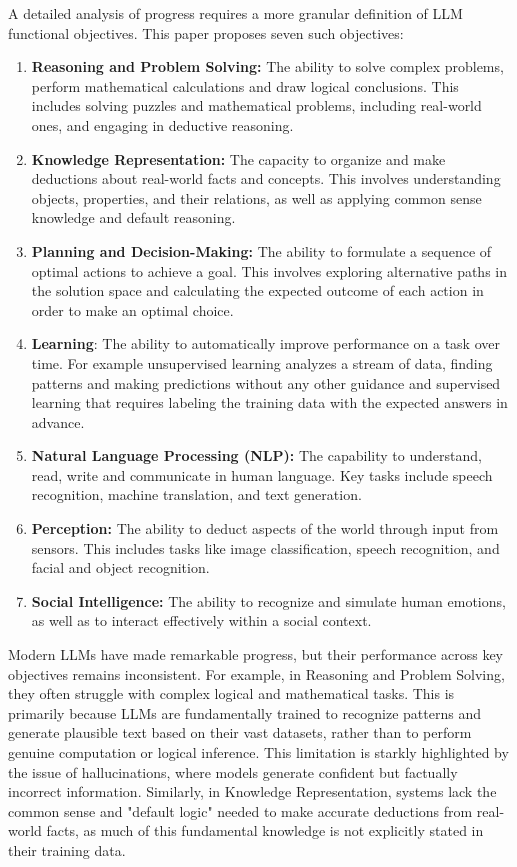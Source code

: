 \documentclass[12pt]{article}
\begin{document}
A detailed analysis of progress requires a more granular definition of LLM functional objectives. This paper proposes seven such objectives:
\begin{enumerate}
    \item \textbf{Reasoning and Problem Solving:} The ability to solve complex problems, perform mathematical calculations and draw logical conclusions. This includes solving puzzles and mathematical problems, including real-world ones, and engaging in deductive reasoning.

    \item \textbf{Knowledge Representation:} The capacity to organize and make deductions about real-world facts and concepts. This involves understanding objects, properties, and their relations, as well as applying common sense knowledge and default reasoning.

    \item \textbf{Planning and Decision-Making:} The ability to formulate a sequence of optimal actions to achieve a goal. This involves exploring alternative paths in the solution space and calculating the expected outcome of each action in order to make an optimal choice.

    \item \textbf{Learning}: The ability to automatically improve performance on a task over time. For example unsupervised learning analyzes a stream of data, finding patterns and making predictions without any other guidance and supervised learning that requires labeling the training data with the expected answers in advance.

     \item \textbf{Natural Language Processing (NLP):}  The capability to understand, read, write and communicate in human language. Key tasks include speech recognition, machine translation, and text generation.

    \item \textbf{Perception:} The ability to deduct aspects of the world through input from sensors. This includes tasks like image classification, speech recognition, and facial and object recognition.

    \item \textbf{Social Intelligence:} The ability to recognize and simulate human emotions, as well as to interact effectively within a social context.
\end{enumerate}
Modern LLMs have made remarkable progress, but their performance across key objectives remains inconsistent. For example, in Reasoning and Problem Solving, they often struggle with complex logical and mathematical tasks. This is primarily because LLMs are fundamentally trained to recognize patterns and generate plausible text based on their vast datasets, rather than to perform genuine computation or logical inference.\cite{inproceedings}\cite{Chomsky} This limitation is starkly highlighted by the issue of hallucinations, where models generate confident but factually incorrect information. Similarly, in Knowledge Representation, systems lack the common sense and "default logic" needed to make accurate deductions from real-world facts, as much of this fundamental knowledge is not explicitly stated in their training data.\\
\end{document}
